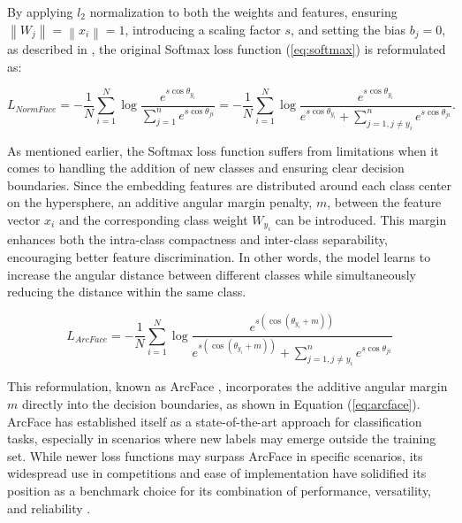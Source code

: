 By applying $l_{2}$ normalization to both the weights and features, ensuring $\left\| {{W}_{j}} \right\|=\left\| {{x}_{i}} \right\|=1$, introducing a scaling factor $s$, and setting the bias ${{b}_{j}}=0$, as described in \cite{wang2017normface}, the original Softmax loss function (\ref{eq:softmax}) is reformulated as:

\begin{equation}
\label{eq:normface}
    L_{NormFace}=-\frac{1}{N}\sum\limits_{i=1}^{N}{\log }\frac{{{e}^{s\cos {{\theta }_{{{y}_{i}}}}}}}{\sum\limits_{j=1}^{n}{{{e}^{s\cos {{\theta }_{ji}}}}}}=-\frac{1}{N}\sum\limits_{i=1}^{N}{\log }\frac{{{e}^{s\cos {{\theta }_{{{y}_{i}}}}}}}{{{e}^{s\cos {{\theta }_{{{y}_{i}}}}}}+\sum\limits_{j=1,j\ne {{y}_{i}}}^{n}{{{e}^{s\cos {{\theta }_{ji}}}}}}.
\end{equation}

As mentioned earlier, the Softmax loss function suffers from limitations when it comes to handling the addition of new classes and ensuring clear decision boundaries. Since the embedding features are distributed around each class center on the hypersphere, an additive angular margin penalty, $m$, between the feature vector $x_i$ and the corresponding class weight $W_{y_i}$ can be introduced. This margin enhances both the intra-class compactness and inter-class separability, encouraging better feature discrimination. In other words, the model learns to increase the angular distance between different classes while simultaneously reducing the distance within the same class.

\begin{equation}
\label{eq:arcface}
    L_{ArcFace}=-\frac{1}{N}\sum\limits_{i=1}^{N}{\log }\frac{{{e}^{s\left( \cos \left( {{\theta }_{{{y}_{i}}}}+m \right) \right)}}}{{{e}^{s\left( \cos \left( {{\theta }_{{{y}_{i}}}}+m \right) \right)}}+\sum\limits_{j=1,j\ne {{y}_{i}}}^{n}{{{e}^{s\cos {{\theta }_{ji}}}}}}
\end{equation}

This reformulation, known as ArcFace \cite{deng2019arcface}, incorporates the additive angular margin $m$ directly into the decision boundaries, as shown in Equation (\ref{eq:arcface}). ArcFace has established itself as a state-of-the-art approach for classification tasks, especially in scenarios where new labels may emerge outside the training set. While newer loss functions may surpass ArcFace in specific scenarios, its widespread use in competitions and ease of implementation have solidified its position as a benchmark choice for its combination of performance, versatility, and reliability \cite{jeon20201st}.


